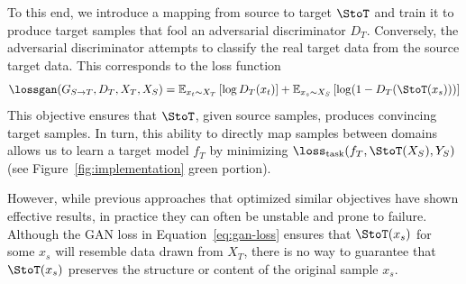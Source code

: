 To this end, we introduce a mapping from source to target $\StoT$ and train it to produce target samples that fool an adversarial discriminator $D_T$.
Conversely, the adversarial discriminator attempts to classify the real target data from the source target data.
This corresponds to the loss function
\begin{align}
  \label{eq:gan-loss}
  \lossgan( G_{S \rightarrow T}, D_T, X_T, X_S) = \mathbb{E}_{x_t \sim X_T}\left[\log D_T(x_t)\right]
    + \mathbb{E}_{x_s \sim X_S}\left[\log(1 - D_T(\StoT(x_s)))\right] 
\end{align}
This objective ensures that $\StoT$, given source samples, produces convincing target samples.
In turn, this ability to directly map samples between domains allows us to learn a target model $f_T$ by minimizing $\loss_{\text{task}}(f_T, \StoT(X_S), Y_S)$ (see Figure~\ref{fig:implementation} green portion).


However, while previous approaches that optimized similar objectives have shown effective results, in practice they can often be unstable and prone to failure.
Although the GAN loss in Equation~\ref{eq:gan-loss} ensures that $\StoT(x_s)$ for some $x_s$ will resemble data drawn from $X_T$, there is no way to guarantee that $\StoT(x_s)$ preserves the structure  or content of the original sample $x_s$.

